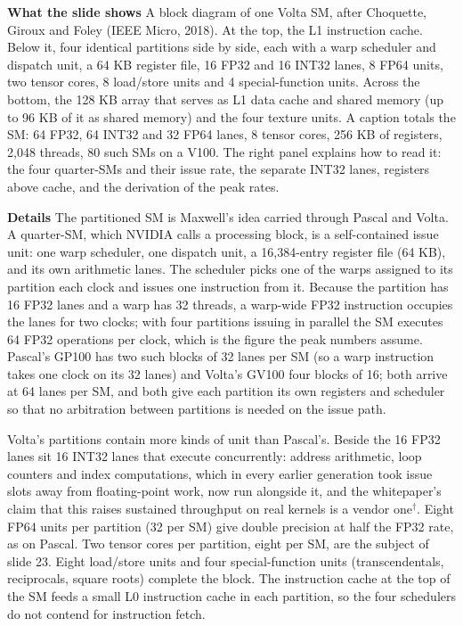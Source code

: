 \documentclass[11pt,letterpaper]{article}
\newcommand{\para}[1]{\medskip\noindent\textbf{#1}\quad}
\begin{document}
\para{What the slide shows} A block diagram of one Volta SM, after Choquette, Giroux and Foley (IEEE Micro, 2018). At the top, the L1 instruction cache. Below it, four identical partitions side by side, each with a warp scheduler and dispatch unit, a 64 KB register file, 16 FP32 and 16 INT32 lanes, 8 FP64 units, two tensor cores, 8 load/store units and 4 special-function units. Across the bottom, the 128 KB array that serves as L1 data cache and shared memory (up to 96 KB of it as shared memory) and the four texture units. A caption totals the SM: 64 FP32, 64 INT32 and 32 FP64 lanes, 8 tensor cores, 256 KB of registers, 2,048 threads, 80 such SMs on a V100. The right panel explains how to read it: the four quarter-SMs and their issue rate, the separate INT32 lanes, registers above cache, and the derivation of the peak rates.

\para{Details} The partitioned SM is Maxwell's idea carried through Pascal and Volta. A quarter-SM, which NVIDIA calls a processing block, is a self-contained issue unit: one warp scheduler, one dispatch unit, a 16,384-entry register file (64 KB), and its own arithmetic lanes. The scheduler picks one of the warps assigned to its partition each clock and issues one instruction from it. Because the partition has 16 FP32 lanes and a warp has 32 threads, a warp-wide FP32 instruction occupies the lanes for two clocks; with four partitions issuing in parallel the SM executes 64 FP32 operations per clock, which is the figure the peak numbers assume. Pascal's GP100 has two such blocks of 32 lanes per SM (so a warp instruction takes one clock on its 32 lanes) and Volta's GV100 four blocks of 16; both arrive at 64 lanes per SM, and both give each partition its own registers and scheduler so that no arbitration between partitions is needed on the issue path.

Volta's partitions contain more kinds of unit than Pascal's. Beside the 16 FP32 lanes sit 16 INT32 lanes that execute concurrently: address arithmetic, loop counters and index computations, which in every earlier generation took issue slots away from floating-point work, now run alongside it, and the whitepaper's claim that this raises sustained throughput on real kernels is a vendor one$^\dagger$. Eight FP64 units per partition (32 per SM) give double precision at half the FP32 rate, as on Pascal. Two tensor cores per partition, eight per SM, are the subject of slide 23. Eight load/store units and four special-function units (transcendentals, reciprocals, square roots) complete the block. The instruction cache at the top of the SM feeds a small L0 instruction cache in each partition, so the four schedulers do not contend for instruction fetch.
\end{document}
